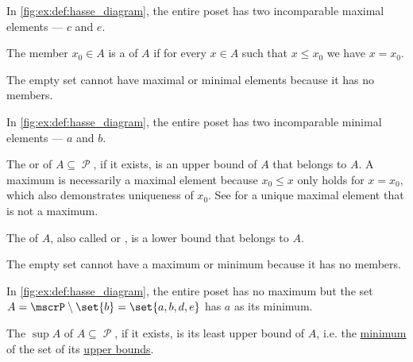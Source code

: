 \begin{definition}
\begin{thmenum}
\begin{minipage}[t]{0.45\textwidth}
      In \cref{fig:ex:def:hasse_diagram}, the entire poset has two incomparable maximal elements --- \( c \) and \( e \).
    \end{minipage}
    \hspace{0.02\textwidth}
    \begin{minipage}[t]{0.45\textwidth}
      The member \( x_0 \in A \) is a  of \( A \) if for every \( x \in A \) such that \( x \leq x_0 \) we have \( x = x_0 \).

      The empty set cannot have maximal or minimal elements because it has no members.

      In \cref{fig:ex:def:hasse_diagram}, the entire poset has two incomparable minimal elements --- \( a \) and \( b \).
    \end{minipage}

    \begin{minipage}[t]{0.45\textwidth}
      The  or  of \( A \subseteq \mscrP \), if it exists, is an upper bound of \( A \) that belongs to \( A \). A maximum is necessarily a maximal element because \( x_0 \leq x \) only holds for \( x = x_0 \), which also demonstrates uniqueness of \( x_0 \). See  for a unique maximal element that is not a maximum.
    \end{minipage}
    \hspace{0.02\textwidth}
    \begin{minipage}[t]{0.45\textwidth}
      The  of \( A \), also called  or , is a lower bound that belongs to \( A \).

      The empty set cannot have a maximum or minimum because it has no members.

      In \cref{fig:ex:def:hasse_diagram}, the entire poset has no maximum but the set \( A = \mscrP \setminus \set{ b } = \set{ a, b, d, e } \) has \( a \) as its minimum.
    \end{minipage}

    \begin{minipage}[t]{0.45\textwidth}
      The  \( \sup A \) of \( A \subseteq \mscrP \), if it exists, is its least upper bound of \( A \), i.e. the \hyperref[def:poset_extremal_points/maximum_and_minimum]{minimum} of the set of its \hyperref[def:poset_extremal_points/upper_and_lower_bounds]{upper bounds}.


\end{minipage}
\end{thmenum}
\end{definition}
